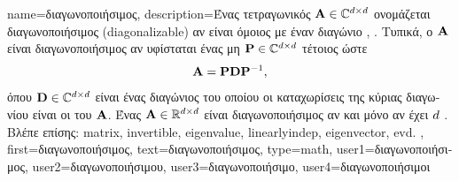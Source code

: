 {name={\foreignlanguage{greek}{διαγωνοποιήσιμος}},
	description={\foreignlanguage{greek}{Ένας τετραγωνικός}  ${\bf A} \in \mathbb{C}^{d \times d}$ 
		\foreignlanguage{greek}{ονομάζεται διαγωνοποιήσιμος} (diagonalizable) 
		\foreignlanguage{greek}{αν είναι όμοιος με έναν διαγώνιο}  \cite{HornMatAnalysis}, \cite{Axler2025}. 
 		\foreignlanguage{greek}{Τυπικά, ο ${\bf A}$ είναι διαγωνοποιήσιμος αν υφίσταται ένας μη}   
		$\mathbf{P} \in \mathbb{C}^{d \times d}$ \foreignlanguage{greek}{τέτοιος ώστε} 
  		\[
  			{\bf A} = \mathbf{P} {\bf D} \mathbf{P}^{-1},
  		\]
		\foreignlanguage{greek}{όπου ${\bf D} \in \mathbb{C}^{d \times d}$ είναι ένας διαγώνιος}  
		\foreignlanguage{greek}{του οποίου οι καταχωρίσεις της κύριας διαγωνίου είναι οι}  
		\foreignlanguage{greek}{του ${\bf A}$. Ένας}  ${\bf A} \in \mathbb{R}^{d \times d}$ 
 		\foreignlanguage{greek}{είναι διαγωνοποιήσιμος αν και μόνο αν έχει} $d$ 
 		 \cite{HornMatAnalysis}. 
 		\\	
 		\foreignlanguage{greek}{Βλέπε επίσης:} \gls{matrix}, \gls{invertible}, \gls{eigenvalue}, \gls{linearlyindep}, \gls{eigenvector}, \gls{evd}. },
 	first={\foreignlanguage{greek}{διαγωνοποιήσιμος}},
 	text={\foreignlanguage{greek}{διαγωνοποιήσιμος}},
	type=math,
	user1={\foreignlanguage{greek}{διαγωνοποιήσιμος}}, %
  	user2={\foreignlanguage{greek}{διαγωνοποιήσιμου}}, %
	user3={\foreignlanguage{greek}{διαγωνοποιήσιμο}}, %
	user4={\foreignlanguage{greek}{διαγωνοποιήσιμοι}} %
}

